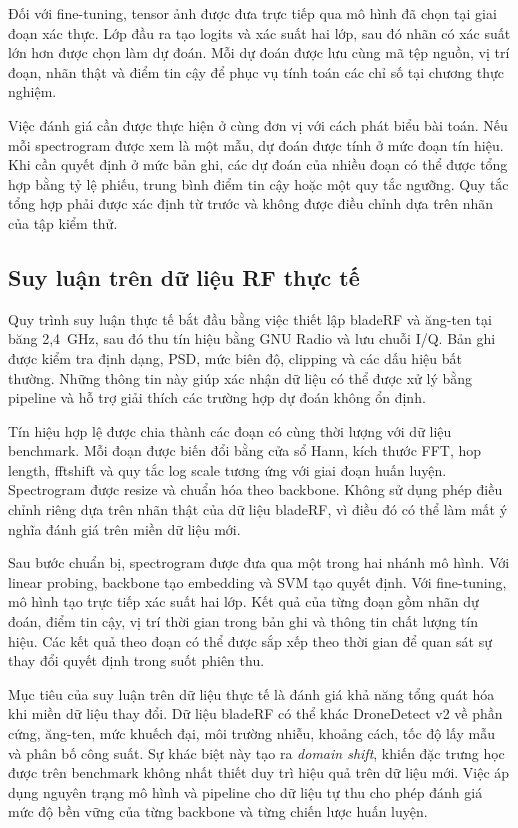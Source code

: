 \documentclass[../DoAn.tex]{subfiles}
\begin{document}
Đối với fine-tuning, tensor ảnh được đưa trực tiếp qua mô hình đã chọn tại giai đoạn xác thực. Lớp đầu ra tạo logits và xác suất hai lớp, sau đó nhãn có xác suất lớn hơn được chọn làm dự đoán. Mỗi dự đoán được lưu cùng mã tệp nguồn, vị trí đoạn, nhãn thật và điểm tin cậy để phục vụ tính toán các chỉ số tại chương thực nghiệm.

Việc đánh giá cần được thực hiện ở cùng đơn vị với cách phát biểu bài toán. Nếu mỗi spectrogram được xem là một mẫu, dự đoán được tính ở mức đoạn tín hiệu. Khi cần quyết định ở mức bản ghi, các dự đoán của nhiều đoạn có thể được tổng hợp bằng tỷ lệ phiếu, trung bình điểm tin cậy hoặc một quy tắc ngưỡng. Quy tắc tổng hợp phải được xác định từ trước và không được điều chỉnh dựa trên nhãn của tập kiểm thử.

\subsection{Suy luận trên dữ liệu RF thực tế}

Quy trình suy luận thực tế bắt đầu bằng việc thiết lập bladeRF và ăng-ten tại băng 2,4~GHz, sau đó thu tín hiệu bằng GNU Radio và lưu chuỗi I/Q. Bản ghi được kiểm tra định dạng, PSD, mức biên độ, clipping và các dấu hiệu bất thường. Những thông tin này giúp xác nhận dữ liệu có thể được xử lý bằng pipeline và hỗ trợ giải thích các trường hợp dự đoán không ổn định.

Tín hiệu hợp lệ được chia thành các đoạn có cùng thời lượng với dữ liệu benchmark. Mỗi đoạn được biến đổi bằng cửa sổ Hann, kích thước FFT, hop length, fftshift và quy tắc log scale tương ứng với giai đoạn huấn luyện. Spectrogram được resize và chuẩn hóa theo backbone. Không sử dụng phép điều chỉnh riêng dựa trên nhãn thật của dữ liệu bladeRF, vì điều đó có thể làm mất ý nghĩa đánh giá trên miền dữ liệu mới.

Sau bước chuẩn bị, spectrogram được đưa qua một trong hai nhánh mô hình. Với linear probing, backbone tạo embedding và SVM tạo quyết định. Với fine-tuning, mô hình tạo trực tiếp xác suất hai lớp. Kết quả của từng đoạn gồm nhãn dự đoán, điểm tin cậy, vị trí thời gian trong bản ghi và thông tin chất lượng tín hiệu. Các kết quả theo đoạn có thể được sắp xếp theo thời gian để quan sát sự thay đổi quyết định trong suốt phiên thu.

Mục tiêu của suy luận trên dữ liệu thực tế là đánh giá khả năng tổng quát hóa khi miền dữ liệu thay đổi. Dữ liệu bladeRF có thể khác DroneDetect v2 về phần cứng, ăng-ten, mức khuếch đại, môi trường nhiễu, khoảng cách, tốc độ lấy mẫu và phân bố công suất. Sự khác biệt này tạo ra \textit{domain shift}, khiến đặc trưng học được trên benchmark không nhất thiết duy trì hiệu quả trên dữ liệu mới. Việc áp dụng nguyên trạng mô hình và pipeline cho dữ liệu tự thu cho phép đánh giá mức độ bền vững của từng backbone và từng chiến lược huấn luyện.
\end{document}
